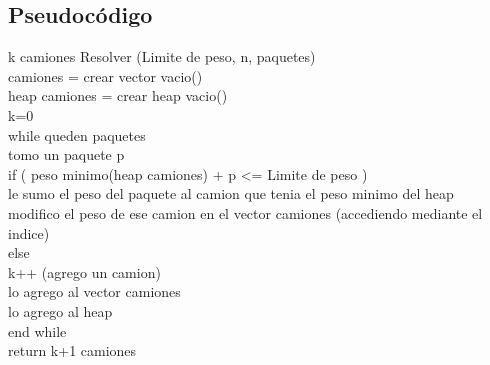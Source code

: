 \subsection{Pseudoc\'odigo}
k camiones Resolver (Limite de peso, n, paquetes)\\
camiones = crear vector vacio()\\
heap camiones = crear heap vacio()\\
k=0\\
while queden paquetes\\

	tomo un paquete p\\
	
	if ( peso minimo(heap camiones) + p <= Limite de peso )\\
	
		le sumo el peso del paquete al camion que tenia el peso minimo del heap\\
		
		modifico el peso de ese camion en el vector camiones (accediendo mediante el
		 indice)\\
		 
	else\\
	
		k++ (agrego un camion)\\
		
		lo agrego al vector camiones\\
		
		lo agrego al heap\\
		
end while\\
return k+1 camiones\\
